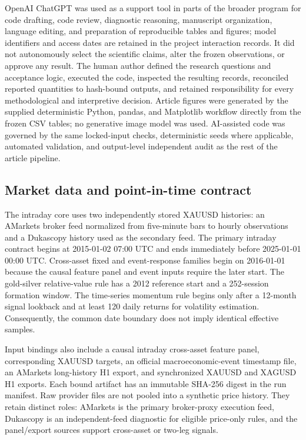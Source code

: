 OpenAI ChatGPT was used as a support tool in parts of the broader program for code drafting, code review, diagnostic reasoning, manuscript organization, language editing, and preparation of reproducible tables and figures; model identifiers and access dates are retained in the project interaction records. It did not autonomously select the scientific claims, alter the frozen observations, or approve any result. The human author defined the research questions and acceptance logic, executed the code, inspected the resulting records, reconciled reported quantities to hash-bound outputs, and retained responsibility for every methodological and interpretive decision. Article figures were generated by the supplied deterministic Python, pandas, and Matplotlib workflow directly from the frozen CSV tables; no generative image model was used. AI-assisted code was governed by the same locked-input checks, deterministic seeds where applicable, automated validation, and output-level independent audit as the rest of the article pipeline.

\subsection{Market data and point-in-time contract}\label{subsec:data}

The intraday core uses two independently stored XAUUSD histories: an AMarkets broker feed normalized from five-minute bars to hourly observations and a Dukascopy history used as the secondary feed. The primary intraday contract begins at 2015-01-02 07:00 UTC and ends immediately before 2025-01-01 00:00 UTC. Cross-asset fixed and event-response families begin on 2016-01-01 because the causal feature panel and event inputs require the later start. The gold-silver relative-value rule has a 2012 reference start and a 252-session formation window. The time-series momentum rule begins only after a 12-month signal lookback and at least 120 daily returns for volatility estimation. Consequently, the common date boundary does not imply identical effective samples.

Input bindings also include a causal intraday cross-asset feature panel, corresponding XAUUSD targets, an official macroeconomic-event timestamp file, an AMarkets long-history H1 export, and synchronized XAUUSD and XAGUSD H1 exports. Each bound artifact has an immutable SHA-256 digest in the run manifest. Raw provider files are not pooled into a synthetic price history. They retain distinct roles: AMarkets is the primary broker-proxy execution feed, Dukascopy is an independent-feed diagnostic for eligible price-only rules, and the panel/export sources support cross-asset or two-leg signals.

